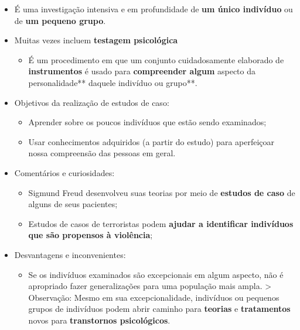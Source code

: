 \documentclass[
]{book}
\providecommand{\tightlist}{%
  \setlength{\itemsep}{0pt}\setlength{\parskip}{0pt}}
\begin{document}
\begin{itemize}
\tightlist
\item
  É uma investigação intensiva e em profundidade de \textbf{um único
  indivíduo} ou de \textbf{um pequeno grupo}.
\item
  Muitas vezes incluem \textbf{testagem psicológica}

  \begin{itemize}
  \tightlist
  \item
    É um procedimento em que um conjunto cuidadosamente elaborado de
    \textbf{instrumentos} é usado para \textbf{compreender algum
    }aspecto da personalidade** daquele indivíduo ou grupo**.
  \end{itemize}
\item
  Objetivos da realização de estudos de caso:

  \begin{itemize}
  \tightlist
  \item
    Aprender sobre os poucos indivíduos que estão sendo examinados;
  \item
    Usar conhecimentos adquiridos (a partir do estudo) para aperfeiçoar
    nossa compreensão das pessoas em geral.
  \end{itemize}
\item
  Comentários e curiosidades:

  \begin{itemize}
  \tightlist
  \item
    Sigmund Freud desenvolveu suas teorias por meio de \textbf{estudos
    de caso} de alguns de seus pacientes;
  \item
    Estudos de casos de terroristas podem \textbf{ajudar a identificar
    indivíduos que são propensos à violência};
  \end{itemize}
\item
  Desvantagens e inconvenientes:

  \begin{itemize}
  \tightlist
  \item
    Se os indivíduos examinados são excepcionais em algum aspecto, não é
    apropriado fazer generalizações para uma população mais ampla.
    \textgreater{} Observação: Mesmo em sua excepcionalidade, indivíduos
    ou pequenos grupos de indivíduos podem abrir caminho para
    \textbf{teorias} e \textbf{tratamentos} novos para
    \textbf{transtornos psicológicos}.
  \end{itemize}
\end{itemize}
\end{document}
